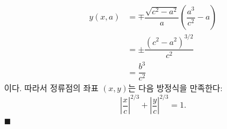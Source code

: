 \documentclass[twocolumn]{article}
\begin{document}
$$ \begin{aligned}
y(x, a) &= \mp \dfrac{\sqrt{c^2-a^2}}{a}\left(\dfrac{a^3}{c^2}-a\right)\\
	& = \pm \dfrac{\left( c^2- a^2 \right)^{3/2}}{c^2}\\
	& = \dfrac{b^3}{c^2}
\end{aligned}
$$
이다. 따라서 정류점의 좌표 $(x, y)$는 다음 방정식을 만족한다:
$$ \left|\dfrac{x}{c}\right|^{2/3} + \left|\dfrac{y}{c}\right|^{2/3} = 1. $$
$\blacksquare$

\end{document}
